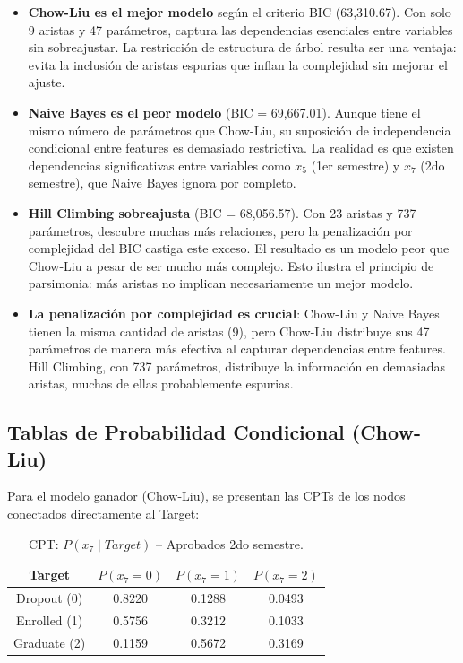 \documentclass[12pt,a4paper]{article}
\begin{document}
\begin{itemize}
    \item \textbf{Chow-Liu es el mejor modelo} según el criterio BIC (63,310.67). Con solo 9 aristas y 47 parámetros, captura las dependencias esenciales entre variables sin sobreajustar. La restricción de estructura de árbol resulta ser una ventaja: evita la inclusión de aristas espurias que inflan la complejidad sin mejorar el ajuste.

    \item \textbf{Naive Bayes es el peor modelo} (BIC = 69,667.01). Aunque tiene el mismo número de parámetros que Chow-Liu, su suposición de independencia condicional entre features es demasiado restrictiva. La realidad es que existen dependencias significativas entre variables como $x_5$ (1er semestre) y $x_7$ (2do semestre), que Naive Bayes ignora por completo.

    \item \textbf{Hill Climbing sobreajusta} (BIC = 68,056.57). Con 23 aristas y 737 parámetros, descubre muchas más relaciones, pero la penalización por complejidad del BIC castiga este exceso. El resultado es un modelo peor que Chow-Liu a pesar de ser mucho más complejo. Esto ilustra el principio de parsimonia: más aristas no implican necesariamente un mejor modelo.

    \item \textbf{La penalización por complejidad es crucial}: Chow-Liu y Naive Bayes tienen la misma cantidad de aristas (9), pero Chow-Liu distribuye sus 47 parámetros de manera más efectiva al capturar dependencias entre features. Hill Climbing, con 737 parámetros, distribuye la información en demasiadas aristas, muchas de ellas probablemente espurias.
\end{itemize}

\subsection{Tablas de Probabilidad Condicional (Chow-Liu)}

Para el modelo ganador (Chow-Liu), se presentan las CPTs de los nodos conectados directamente al Target:

\begin{table}[H]
    \centering
    \begin{tabular}{c|ccc}
        \toprule
        \textbf{Target} & $P(x_7=0)$ & $P(x_7=1)$ & $P(x_7=2)$ \\
        \midrule
        Dropout (0) & 0.8220 & 0.1288 & 0.0493 \\
        Enrolled (1) & 0.5756 & 0.3212 & 0.1033 \\
        Graduate (2) & 0.1159 & 0.5672 & 0.3169 \\
        \bottomrule
    \end{tabular}
    \caption{CPT: $P(x_7 \mid Target)$ -- Aprobados 2do semestre.}
\end{table}
\end{document}
